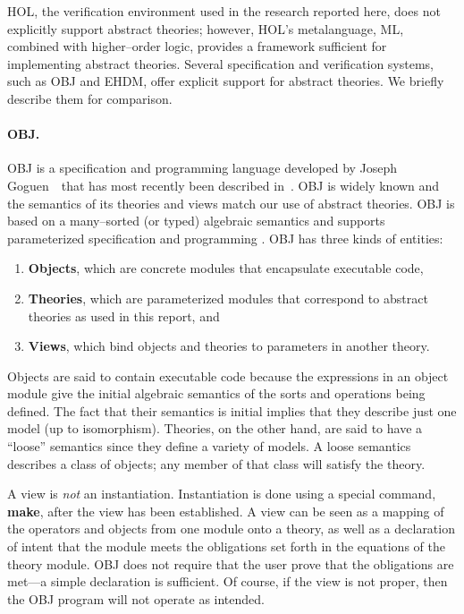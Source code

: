 HOL, the verification environment used in the research reported here, does
not explicitly support abstract theories; however, HOL's metalanguage, ML,
combined with higher--order logic, provides a framework sufficient for
implementing abstract theories.  Several specification and verification
systems, such as OBJ and EHDM, offer explicit support for abstract
theories.  We briefly describe them for comparison.

\paragraph{OBJ.}
OBJ is a specification and programming language developed by Joseph
Goguen~\etal\ that has most recently been described in~\cite{obj-ref-man}.
OBJ is widely known and the semantics of its theories and views match our
use of abstract theories.  OBJ is based on a many--sorted (or typed)
algebraic semantics and supports parameterized specification and
programming \cite{obj-param-prog}. OBJ has three kinds of entities:
\begin{enumerate}
\item
{\bf Objects}, which are concrete modules that encapsulate executable code,
\item
{\bf Theories}, which are parameterized modules that correspond to abstract
theories as used in this report, and
\item
{\bf Views}, which bind objects and theories to parameters in another
theory.
\end{enumerate}

Objects are said to contain executable code because the expressions in an
object module give the initial algebraic semantics of the sorts and
operations being defined.  The fact that their semantics is initial implies
that they describe just one model (up to isomorphism).  Theories, on the
other hand, are said to have a ``loose'' semantics since they define a
variety of models.  A loose semantics describes a class of objects; any
member of that class will satisfy the theory.

A view is {\em not} an instantiation.  Instantiation is done using a
special command, {\bf make}, after the view has been established.  A view
can be seen as a mapping of the operators and objects from one module onto
a theory, as well as a declaration of intent that the module meets the
obligations set forth in the equations of the theory module.  OBJ does not
require that the user prove that the obligations are met---a simple
declaration is sufficient.  Of course, if the view is not proper, then the
OBJ program will not operate as intended.

